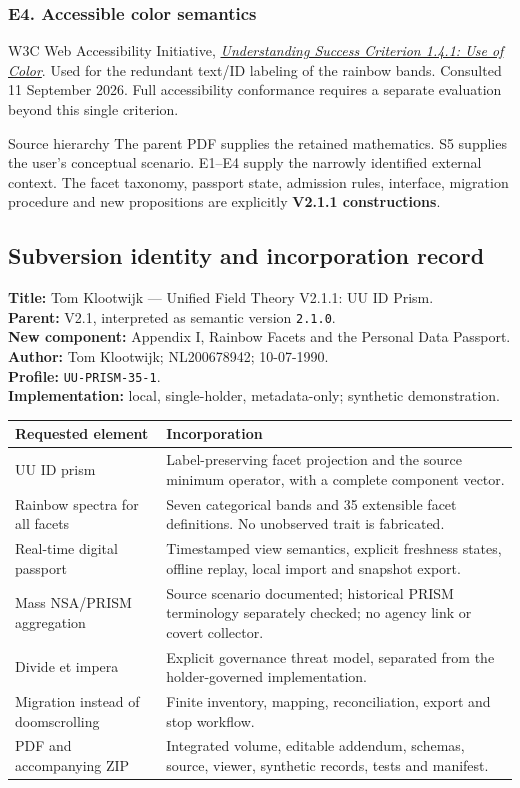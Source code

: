 \documentclass[11pt,a4paper]{article}
\newcommand{\newpagehead}[1]{\clearpage\subsection{#1}}
\begin{document}
\subsubsection{E4. Accessible color semantics}
W3C Web Accessibility Initiative, \href{https://www.w3.org/WAI/WCAG22/Understanding/use-of-color.html}{\emph{Understanding Success Criterion 1.4.1: Use of Color}}. Used for the redundant text/ID labeling of the rainbow bands. Consulted 11 September 2026. Full accessibility conformance requires a separate evaluation beyond this single criterion.

\begin{note}{Source hierarchy}
The parent PDF supplies the retained mathematics. S5 supplies the user's conceptual scenario. E1--E4 supply the narrowly identified external context. The facet taxonomy, passport state, admission rules, interface, migration procedure and new propositions are explicitly \textbf{V2.1.1 constructions}.
\end{note}

\newpagehead{Subversion identity and incorporation record}
\textbf{Title:} Tom Klootwijk --- Unified Field Theory V2.1.1: UU ID Prism.\\
\textbf{Parent:} V2.1, interpreted as semantic version \texttt{2.1.0}.\\
\textbf{New component:} Appendix I, Rainbow Facets and the Personal Data Passport.\\
\textbf{Author:} Tom Klootwijk; NL200678942; 10-07-1990.\\
\textbf{Profile:} \texttt{UU-PRISM-35-1}.\\
\textbf{Implementation:} local, single-holder, metadata-only; synthetic demonstration.

\begin{center}\small\begin{tabularx}{\textwidth}{@{}p{}X@{}}\toprule
\textbf{Requested element} & \textbf{Incorporation}\\\midrule
UU ID prism & Label-preserving facet projection and the source minimum operator, with a complete component vector.\\[7pt]
Rainbow spectra for all facets & Seven categorical bands and 35 extensible facet definitions. No unobserved trait is fabricated.\\[7pt]
Real-time digital passport & Timestamped view semantics, explicit freshness states, offline replay, local import and snapshot export.\\[7pt]
Mass NSA/PRISM aggregation & Source scenario documented; historical PRISM terminology separately checked; no agency link or covert collector.\\[7pt]
Divide et impera & Explicit governance threat model, separated from the holder-governed implementation.\\[7pt]
Migration instead of doomscrolling & Finite inventory, mapping, reconciliation, export and stop workflow.\\[7pt]
PDF and accompanying ZIP & Integrated volume, editable addendum, schemas, source, viewer, synthetic records, tests and manifest.\\\bottomrule
\end{tabularx}\end{center}
\end{document}
